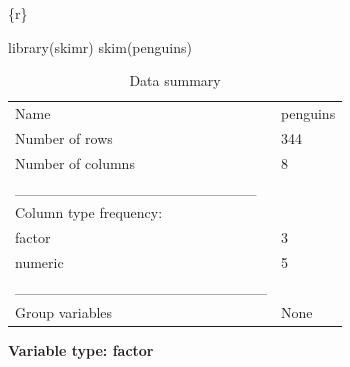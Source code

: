 \documentclass[
  letterpaper,
  DIV=11,
  numbers=noendperiod]{scrreprt}
\newenvironment{Shaded}{\begin{snugshade}}{\end{snugshade}}
\newcommand{\FunctionTok}[1]{\textcolor[rgb]{0.28,0.35,0.67}{#1}}
\newcommand{\InformationTok}[1]{\textcolor[rgb]{0.37,0.37,0.37}{#1}}
\newcommand{\NormalTok}[1]{\textcolor[rgb]{0.00,0.23,0.31}{#1}}
\begin{document}
\begin{Shaded}
\begin{Highlighting}[]
\InformationTok{\textasciigrave{}\textasciigrave{}\textasciigrave{}\{r\}}

\FunctionTok{library}\NormalTok{(skimr)}
\FunctionTok{skim}\NormalTok{(penguins)}
\InformationTok{\textasciigrave{}\textasciigrave{}\textasciigrave{}}
\end{Highlighting}
\end{Shaded}

\begin{longtable}[]{@{}ll@{}}
\caption{Data summary}\tabularnewline
\toprule()
\endhead
Name & penguins \\
Number of rows & 344 \\
Number of columns & 8 \\
\_\_\_\_\_\_\_\_\_\_\_\_\_\_\_\_\_\_\_\_\_\_\_ & \\
Column type frequency: & \\
factor & 3 \\
numeric & 5 \\
\_\_\_\_\_\_\_\_\_\_\_\_\_\_\_\_\_\_\_\_\_\_\_\_ & \\
Group variables & None \\
\bottomrule()
\end{longtable}

\textbf{Variable type: factor}
\end{document}
